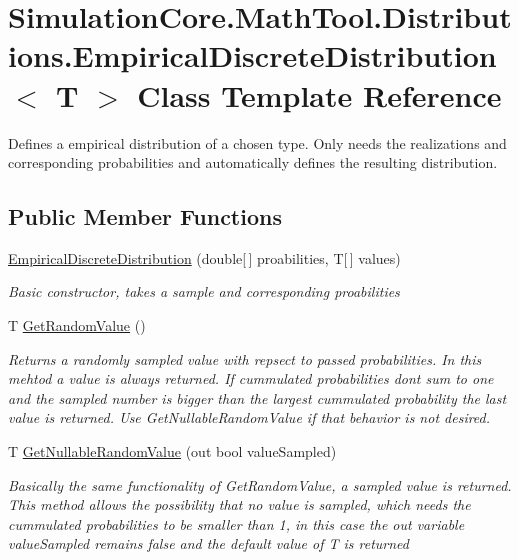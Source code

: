 \hypertarget{class_simulation_core_1_1_math_tool_1_1_distributions_1_1_empirical_discrete_distribution}{}\section{Simulation\+Core.\+Math\+Tool.\+Distributions.\+Empirical\+Discrete\+Distribution$<$ T $>$ Class Template Reference}
\label{class_simulation_core_1_1_math_tool_1_1_distributions_1_1_empirical_discrete_distribution}


Defines a empirical distribution of a chosen type. Only needs the realizations and corresponding probabilities and automatically defines the resulting distribution.  


\subsection*{Public Member Functions}
\begin{DoxyCompactItemize}
\item 
\hyperlink{class_simulation_core_1_1_math_tool_1_1_distributions_1_1_empirical_discrete_distribution_a899740ce0e9e974984ad29659208342a}{Empirical\+Discrete\+Distribution} (double\mbox{[}$\,$\mbox{]} proabilities, T\mbox{[}$\,$\mbox{]} values)
\begin{DoxyCompactList}\small\item\em Basic constructor, takes a sample and corresponding proabilities \end{DoxyCompactList}\item 
T \hyperlink{class_simulation_core_1_1_math_tool_1_1_distributions_1_1_empirical_discrete_distribution_ab2bc2e5a62061769cbcd7ee0953619f0}{Get\+Random\+Value} ()
\begin{DoxyCompactList}\small\item\em Returns a randomly sampled value with repsect to passed probabilities. In this mehtod a value is always returned. If cummulated probabilities don\textquotesingle{}t sum to one and the sampled number is bigger than the largest cummulated probability the last value is returned. Use Get\+Nullable\+Random\+Value if that behavior is not desired. \end{DoxyCompactList}\item 
T \hyperlink{class_simulation_core_1_1_math_tool_1_1_distributions_1_1_empirical_discrete_distribution_af82b5681fdc0a00e93ad9d86f36b26e4}{Get\+Nullable\+Random\+Value} (out bool value\+Sampled)
\begin{DoxyCompactList}\small\item\em Basically the same functionality of Get\+Random\+Value, a sampled value is returned. This method allows the possibility that no value is sampled, which needs the cummulated probabilities to be smaller than 1, in this case the out variable value\+Sampled remains false and the default value of T is returned \end{DoxyCompactList}\end{DoxyCompactItemize}
